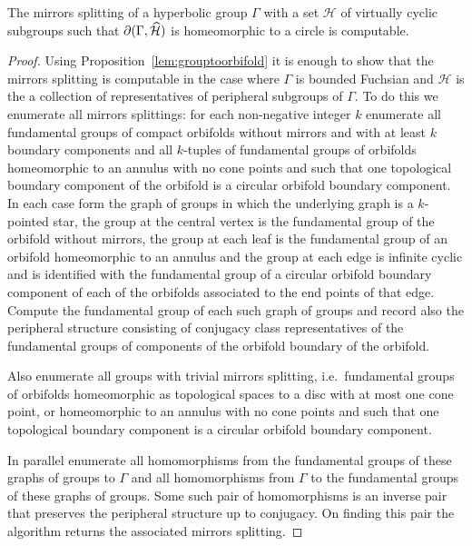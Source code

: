 \begin{lem} The mirrors splitting of a hyperbolic group $\Gamma$ with a set
$\mathcal{H}$ of virtually cyclic subgroups such that $\partial(\Gamma,
\widehat{\mathcal{H}})$ is homeomorphic to a circle is computable.\end{lem}

\begin{proof} Using Proposition~\ref{lem:grouptoorbifold} it is enough to show
  that the mirrors splitting is computable in the case where $\Gamma$ is
  bounded Fuchsian and $\mathcal{H}$ is the a collection of representatives of
  peripheral subgroups of $\Gamma$. To do this we enumerate all mirrors
  splittings: for each non-negative integer $k$ enumerate all fundamental
  groups of compact orbifolds without mirrors and with at least $k$ boundary
  components and all $k$-tuples of fundamental groups of orbifolds homeomorphic
  to an annulus with no cone points and such that one topological boundary
  component of the orbifold is a circular orbifold boundary component. In each
  case form the graph of groups in which the underlying graph is a $k$-pointed
  star, the group at the central vertex is the fundamental group of the
  orbifold without mirrors, the group at each leaf is the fundamental group of
  an orbifold homeomorphic to an annulus and the group at each edge is infinite
  cyclic and is identified with the fundamental group of a circular orbifold
  boundary component of each of the orbifolds associated to the end points of
  that edge. Compute the fundamental group of each such graph of groups and
  record also the peripheral structure consisting of conjugacy class
  representatives of the fundamental groups of components of the orbifold
  boundary of the orbifold.

  Also enumerate all groups with trivial mirrors splitting, i.e.\ fundamental
  groups of orbifolds homeomorphic as topological spaces to a disc with at most
  one cone point, or homeomorphic to an annulus with no cone points and such
  that one topological boundary component is a circular orbifold boundary
  component.

  In parallel enumerate all homomorphisms from the fundamental groups of these
  graphs of groups to $\Gamma$ and all homomorphisms from $\Gamma$ to the
  fundamental groups of these graphs of groups. Some such pair of homomorphisms
  is an inverse pair that preserves the peripheral structure up to conjugacy.
  On finding this pair the algorithm returns the associated mirrors splitting.
\end{proof}

